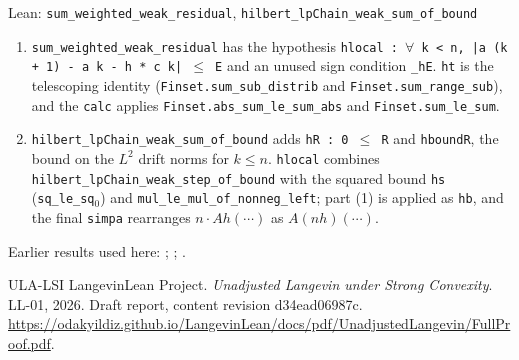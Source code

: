 \documentclass[11pt,a4paper]{article}
\begin{document}
\begin{leanbox}{Lean: \texttt{sum\_\allowbreak{}weighted\_\allowbreak{}weak\_\allowbreak{}residual}, \texttt{hilbert\_\allowbreak{}lpChain\_\allowbreak{}weak\_\allowbreak{}sum\_\allowbreak{}of\_\allowbreak{}bound}}
\begin{enumerate}
\item \texttt{sum\_\allowbreak{}weighted\_\allowbreak{}weak\_\allowbreak{}residual} has the hypothesis \texttt{hlocal : \ensuremath{\forall} k < n, |a (k + 1) -\allowbreak{} a k -\allowbreak{} h * c k| \ensuremath{\le} E} and an unused sign condition \texttt{\_\allowbreak{}h\allowbreak{}E}. \texttt{ht} is the telescoping identity (\texttt{Finset.\allowbreak{}sum\_\allowbreak{}sub\_\allowbreak{}distrib} and \texttt{Finset.\allowbreak{}sum\_\allowbreak{}range\_\allowbreak{}sub}), and the \texttt{calc} applies \texttt{Finset.\allowbreak{}abs\_\allowbreak{}sum\_\allowbreak{}le\_\allowbreak{}sum\_\allowbreak{}abs} and \texttt{Finset.\allowbreak{}sum\_\allowbreak{}le\_\allowbreak{}sum}.

\item \texttt{hilbert\_\allowbreak{}lp\allowbreak{}Chain\_\allowbreak{}weak\_\allowbreak{}sum\_\allowbreak{}of\_\allowbreak{}bound} adds \texttt{h\allowbreak{}R : 0 \ensuremath{\le} R} and \texttt{hbound\allowbreak{}R}, the bound on the \(L^2\) drift norms for \(k\le n\). \texttt{hlocal} combines \texttt{hilbert\_\allowbreak{}lp\allowbreak{}Chain\_\allowbreak{}weak\_\allowbreak{}step\_\allowbreak{}of\_\allowbreak{}bound} with the squared bound \texttt{hs} (\texttt{sq\_\allowbreak{}le\_\allowbreak{}sq\ensuremath{{}_{0}}}) and \texttt{mul\_\allowbreak{}le\_\allowbreak{}mul\_\allowbreak{}of\_\allowbreak{}nonneg\_\allowbreak{}left}; part (1) is applied as \texttt{hb}, and the final \texttt{simpa} rearranges \(n\cdot Ah(\cdots)\) as \(A(nh)(\cdots)\).

\end{enumerate}
\end{leanbox}


Earlier results used here: \cite[Section~3.13.2]{LangevinLean2026ULASC}; \cite[Section~3.19.1]{LangevinLean2026ULASC}; \cite[Section~3.46.2]{LangevinLean2026ULASC}.

\begin{thebibliography}{ULA-LSI}
LangevinLean Project. \emph{Unadjusted Langevin under Strong Convexity}. LL-01, 2026. Draft report, content revision d34ead06987c. \url{https://odakyildiz.github.io/LangevinLean/docs/pdf/UnadjustedLangevin/FullProof.pdf}.
\end{thebibliography}
\end{document}
